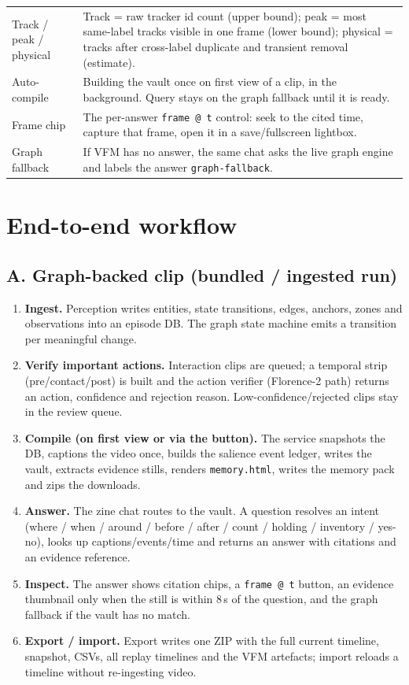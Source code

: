 \documentclass[10pt,a4paper]{article}
\newcommand{\code}[1]{\texttt{\small #1}}
\begin{document}
\begin{center}
\begin{tabularx}{\linewidth}{@{}l X@{}}
Track / peak / physical & Track = raw tracker id count (upper bound); peak = most same-label tracks visible in one frame (lower bound); physical = tracks after cross-label duplicate and transient removal (estimate). \\
Auto-compile & Building the vault once on first view of a clip, in the background. Query stays on the graph fallback until it is ready. \\
Frame chip & The per-answer \code{frame @ t} control: seek to the cited time, capture that frame, open it in a save/fullscreen lightbox. \\
Graph fallback & If VFM has no answer, the same chat asks the live graph engine and labels the answer \code{graph-fallback}. \\
\bottomrule
\end{tabularx}
\end{center}

\section{End-to-end workflow}

\subsection*{A. Graph-backed clip (bundled / ingested run)}

\begin{enumerate}[leftmargin=1.35em,itemsep=1pt]
  \item \textbf{Ingest.} Perception writes entities, state transitions, edges, anchors, zones and observations into an episode DB. The graph state machine emits a transition per meaningful change.
  \item \textbf{Verify important actions.} Interaction clips are queued; a temporal strip (pre/contact/post) is built and the action verifier (Florence-2 path) returns an action, confidence and rejection reason. Low-confidence/rejected clips stay in the review queue.
  \item \textbf{Compile (on first view or via the button).} The service snapshots the DB, captions the video once, builds the salience event ledger, writes the vault, extracts evidence stills, renders \code{memory.html}, writes the memory pack and zips the downloads.
  \item \textbf{Answer.} The zine chat routes to the vault. A question resolves an intent (where / when / around / before / after / count / holding / inventory / yes-no), looks up captions/events/time and returns an answer with citations and an evidence reference.
  \item \textbf{Inspect.} The answer shows citation chips, a \code{frame @ t} button, an evidence thumbnail only when the still is within 8\,s of the question, and the graph fallback if the vault has no match.
  \item \textbf{Export / import.} Export writes one ZIP with the full current timeline, snapshot, CSVs, all replay timelines and the VFM artefacts; import reloads a timeline without re-ingesting video.
\end{enumerate}
\end{document}
